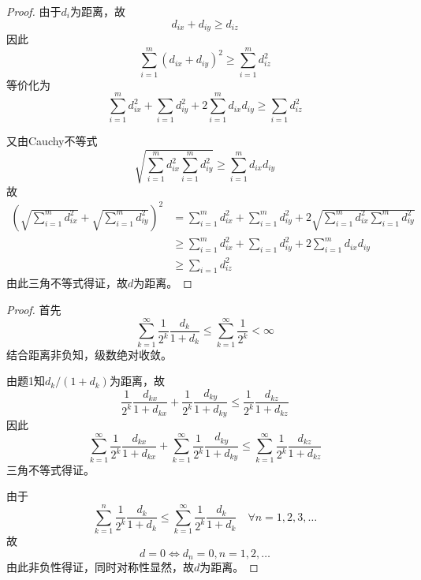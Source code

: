 \documentclass[cn]{homework}
\begin{document}
\begin{subproblem}
\begin{proof}
        由于$d_i$为距离，故
        \[d_{ix}+d_{iy}\geq d_{iz}\]
        因此
        \[\sum_{i=1}^m \left(d_{ix}+d_{iy}\right)^2
        \geq\sum_{i=1}^m d_{iz}^2\]
        等价化为
        \[\sum_{i=1}^m d_{ix}^2+\sum_{i=1} d_{iy}^2
        +2\sum_{i=1}^m d_{ix}d_{iy}\geq\sum_{i=1} d_{iz}^2\]

        又由Cauchy不等式
        \[\sqrt{\sum_{i=1}^m d_{ix}^2\sum_{i=1}^m d_{iy}^2}
        \geq\sum_{i=1}^m d_{ix}d_{iy}\]
        故
        \begin{align*}
        \left(\sqrt{\sum_{i=1}^m d_{ix}^2}
        +\sqrt{\sum_{i=1}^m d_{iy}^2}\right)^2
        &=\sum_{i=1}^m d_{ix}^2+\sum_{i=1}^m d_{iy}^2
        +2\sqrt{\sum_{i=1}^m d_{ix}^2\sum_{i=1}^m d_{iy}^2}\\
        &\geq
        \sum_{i=1}^m d_{ix}^2+\sum_{i=1} d_{iy}^2
        +2\sum_{i=1}^m d_{ix}d_{iy}\\
        &\geq\sum_{i=1} d_{iz}^2
        \end{align*}
        由此三角不等式得证，故$d$为距离。
        \end{proof}

        \item
        \begin{proof}
        首先
        \[\sum_{k=1}^\infty\frac{1}{2^k}\frac{d_k}{1+d_k}
        \leq\sum_{k=1}^\infty\frac{1}{2^k}<\infty\]
        结合距离非负知，级数绝对收敛。

        由题1知$d_k/\left(1+d_k\right)$为距离，故
        \[\frac{1}{2^k}\frac{d_{kx}}{1+d_{kx}}
        +\frac{1}{2^k}\frac{d_{ky}}{1+d_{ky}}
        \leq \frac{1}{2^k}\frac{d_{kz}}{1+d_{kz}}\]
        因此
        \[
            \sum_{k=1}^\infty\frac{1}{2^k}\frac{d_{kx}}{1+d_{kx}}
            +\sum_{k=1}^\infty\frac{1}{2^k}\frac{d_{ky}}{1+d_{ky}}
            \leq\sum_{k=1}^\infty\frac{1}{2^k}\frac{d_{kz}}{1+d_{kz}}
        \]
        三角不等式得证。

        由于
        \[\sum_{k=1}^n\frac{1}{2^k}\frac{d_k}{1+d_k}
        \leq\sum_{k=1}^\infty\frac{1}{2^k}\frac{d_k}{1+d_k}
        \quad\forall n=1,2,3,\ldots\]
        故
        \[d=0\Leftrightarrow d_n=0,n=1,2,\ldots\]
        由此非负性得证，同时对称性显然，故$d$为距离。
        \end{proof}
    \end{subproblem}
\end{document}
